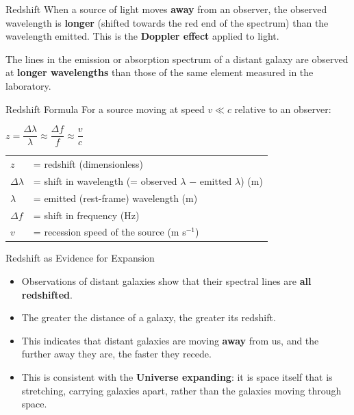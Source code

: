 \begin{definitionbox}{Redshift}
When a source of light moves \textbf{away} from an observer, the observed wavelength is \textbf{longer} (shifted towards the red end of the spectrum) than the wavelength emitted. This is the \textbf{Doppler effect} applied to light.

The lines in the emission or absorption spectrum of a distant galaxy are observed at \textbf{longer wavelengths} than those of the same element measured in the laboratory.
\end{definitionbox}

\begin{formulabox}{Redshift Formula}
For a source moving at speed $v \ll c$ relative to an observer:
\begin{center}
\Large $z = \dfrac{\Delta\lambda}{\lambda} \approx \dfrac{\Delta f}{f} \approx \dfrac{v}{c}$
\end{center}
\vspace{0.3em}
\begin{tabular}{@{}ll@{}}
$z$ & = redshift (dimensionless) \\
$\Delta\lambda$ & = shift in wavelength (= observed $\lambda$ $-$ emitted $\lambda$) (m) \\
$\lambda$ & = emitted (rest-frame) wavelength (m) \\
$\Delta f$ & = shift in frequency (Hz) \\
$v$ & = recession speed of the source (m s$^{-1}$) \\
\end{tabular}
\end{formulabox}

\begin{keybox}{Redshift as Evidence for Expansion}
\begin{itemize}[itemsep=3pt]
  \item Observations of distant galaxies show that their spectral lines are \textbf{all redshifted}.
  \item The greater the distance of a galaxy, the greater its redshift.
  \item This indicates that distant galaxies are moving \textbf{away} from us, and the further away they are, the faster they recede.
  \item This is consistent with the \textbf{Universe expanding}: it is space itself that is stretching, carrying galaxies apart, rather than the galaxies moving through space.
\end{itemize}
\end{keybox}

